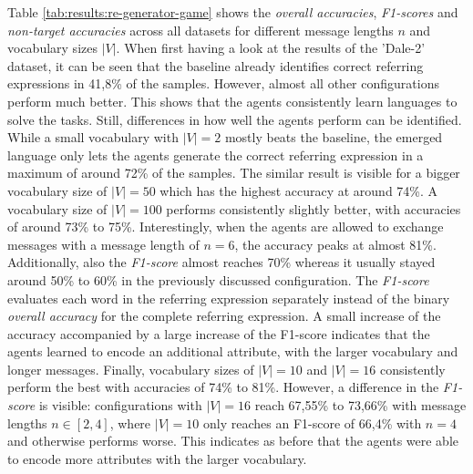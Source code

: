Table \ref{tab:results:re-generator-game} shows the \emph{overall accuracies}, \emph{F1-scores} and \emph{non-target accuracies} across all datasets for different message lengths $n$ and vocabulary sizes $|V|$.
When first having a look at the results of the 'Dale-2' dataset, it can be seen that the baseline already identifies correct referring expressions in 41,8\% of the samples.
However, almost all other configurations perform much better.
This shows that the agents consistently learn languages to solve the tasks.
Still, differences in how well the agents perform can be identified.
While a small vocabulary with $|V| = 2$ mostly beats the baseline, the emerged language only lets the agents generate the correct referring expression in a maximum of around 72\% of the samples.
The similar result is visible for a bigger vocabulary size of $|V|=50$ which has the highest accuracy at around 74\%.
A vocabulary size of $|V|=100$ performs consistently slightly better, with accuracies of around 73\% to 75\%.
Interestingly, when the agents are allowed to exchange messages with a message length of $n=6$, the accuracy peaks at almost 81\%.
Additionally, also the \emph{F1-score} almost reaches 70\% whereas it usually stayed around 50\% to 60\% in the previously discussed configuration.
The \emph{F1-score} evaluates each word in the referring expression separately instead of the binary \emph{overall accuracy} for the complete referring expression.
A small increase of the accuracy accompanied by a large increase of the F1-score indicates that the agents learned to encode an additional attribute, with the larger vocabulary and longer messages.
Finally, vocabulary sizes of $|V|=10$ and $|V|=16$ consistently perform the best with accuracies of 74\% to 81\%.
However, a difference in the \emph{F1-score} is visible: configurations with $|V|=16$ reach 67,55\% to 73,66\% with message lengths $n \in [2,4]$, where $|V|=10$ only reaches an F1-score of 66,4\% with $n=4$ and otherwise performs worse.
This indicates as before that the agents were able to encode more attributes with the larger vocabulary.

